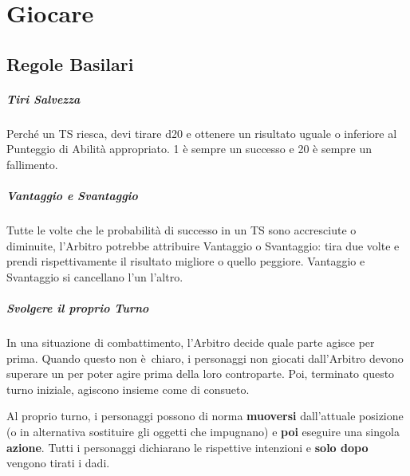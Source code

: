 \documentclass[itdr]{subfiles}
\begin{document}
\cleartoleftpage

\chapter{Giocare}
\label{ch:giocare}

\section{Regole Basilari}

\paragraph{Tiri Salvezza}
Perché un TS riesca, devi tirare d20 e ottenere un risultato uguale o inferiore al Punteggio di Abilità appropriato. 1 è sempre un successo e 20 è \mbox{sempre} un fallimento.

\vfill

\paragraph{Vantaggio e Svantaggio}
Tutte le volte che le probabilità di successo in un TS sono accresciute o diminuite, l’Arbitro potrebbe attribuire Vantaggio o Svantaggio: tira due volte e prendi rispettivamente il risultato migliore o quello peggiore. Vantaggio e Svantaggio si cancellano l’un l’altro. 

\vfill

\paragraph{Svolgere il proprio Turno}
In una situazione di combattimento, l’Arbitro decide quale parte agisce per prima. Quando questo non è~chiaro, i personaggi non giocati dall'Arbitro devono superare un  per poter agire prima della \mbox{loro} controparte. Poi, terminato questo turno iniziale, agiscono insieme come di consueto.

Al proprio turno, i personaggi possono di norma \textbf{muoversi} dall’attuale posizione (o in alternativa sostituire gli oggetti che impugnano) e \textbf{poi} eseguire una singola \textbf{azione}. Tutti i personaggi dichiarano le rispettive \mbox{intenzioni} e \textbf{solo dopo} vengono tirati i dadi. 

\vfill
\end{document}
